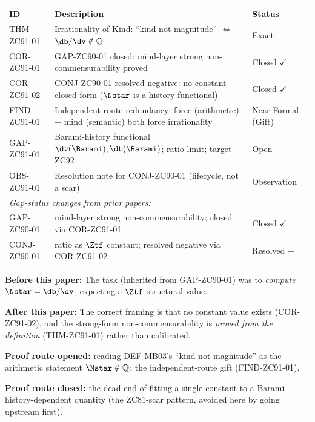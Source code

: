 \documentclass[12pt, a4paper]{article}
\begin{document}
\begin{formalbox}[title={Atomic Registry --- ZC91}]
\begin{center}
\renewcommand{\arraystretch}{1.3}
\small
\begin{tabular}{lp{8.0cm}l}
\toprule
\textbf{ID} & \textbf{Description} & \textbf{Status} \\
\midrule
THM-ZC91-01
  & Irrationality-of-Kind: ``kind not magnitude'' $\Leftrightarrow$
    $\db/\dv\notin\mathbb{Q}$
  & Exact \\[3pt]
COR-ZC91-01
  & GAP-ZC90-01 closed: mind-layer strong non-commensurability proved
  & Closed $\checkmark$ \\[3pt]
COR-ZC91-02
  & CONJ-ZC90-01 resolved negative: no constant closed form ($\Nstar$ is
    a history functional)
  & Closed $\checkmark$ \\[3pt]
FIND-ZC91-01
  & Independent-route redundancy: force (arithmetic) + mind (semantic)
    both force irrationality
  & Near-Formal (Gift) \\[3pt]
GAP-ZC91-01
  & Barami-history functional $\dv(\Barami),\db(\Barami)$; ratio limit;
    target ZC92
  & Open \\[3pt]
OBS-ZC91-01
  & Resolution note for CONJ-ZC90-01 (lifecycle, not a scar)
  & Observation \\[3pt]
\midrule
\multicolumn{3}{l}{\emph{Gap-status changes from prior papers:}} \\
GAP-ZC90-01 & mind-layer strong non-commensurability; closed via
  COR-ZC91-01 & Closed $\checkmark$ \\
CONJ-ZC90-01 & ratio as $\Ztf$ constant; resolved negative via COR-ZC91-02
  & Resolved $-$ \\
\bottomrule
\end{tabular}
\end{center}
\end{formalbox}

\begin{derivedbox}[title={Reframe: ``find the closed form''
  $\to$ ``prove no closed form can exist''}]
\textbf{Before this paper:} The task (inherited from GAP-ZC90-01) was to
\emph{compute} $\Nstar=\db/\dv$, expecting a $\Ztf$-structural value.

\textbf{After this paper:} The correct framing is that no constant value
exists (COR-ZC91-02), and the strong-form non-commensurability is
\emph{proved from the definition} (THM-ZC91-01) rather than calibrated.

\textbf{Proof route opened:} reading DEF-MB03's ``kind not magnitude'' as
the arithmetic statement $\Nstar\notin\mathbb{Q}$; the
independent-route gift (FIND-ZC91-01).

\textbf{Proof route closed:} the dead end of fitting a single constant to
a Barami-history-dependent quantity (the ZC81-scar pattern, avoided here
by going upstream first).
\end{derivedbox}
\end{document}
